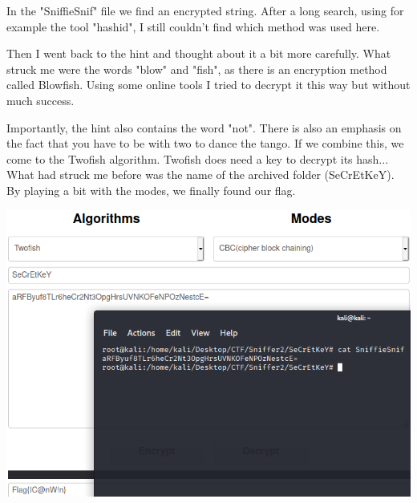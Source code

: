\documentclass[../main.tex]{subfiles}
\begin{document}
\pagebreak
In the "SniffieSnif" file we find an encrypted string. After a long search, using for example the tool "hashid", I still couldn't find which method was used here. 

Then I went back to the hint and thought about it a bit more carefully. What struck me were the words "blow" and "fish", as there is an encryption method called Blowfish. Using some online tools I tried to decrypt it this way but without much success. 

Importantly, the hint also contains the word "not". There is also an emphasis on the fact that you have to be with two to dance the tango. If we combine this, we come to the Twofish algorithm. Twofish does need a key to decrypt its hash... What had struck me before was the name of the archived folder (SeCrEtKeY). By playing a bit with the modes, we finally found our flag.
 \begin{center}
    \includegraphics[width=1\linewidth]{images/Robbe/sniffer2_1.png}
\end{center}
\end{document}

